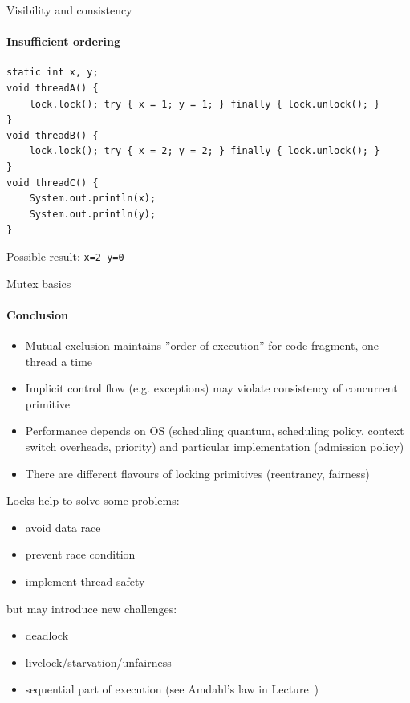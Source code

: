 

\begin{frame}[fragile]{Visibility and consistency}
\framesubtitle{Insufficient ordering}

\begin{verbatim}
static int x, y;
void threadA() {
    lock.lock(); try { x = 1; y = 1; } finally { lock.unlock(); }
}
void threadB() {
    lock.lock(); try { x = 2; y = 2; } finally { lock.unlock(); }
}
void threadC() {
    System.out.println(x);
    System.out.println(y);
}
\end{verbatim}

\pause

Possible result: \texttt{x=2 y=0}

\end{frame}


\begin{frame}{Mutex basics}
\framesubtitle{Conclusion}

\begin{itemize}
    \item Mutual exclusion maintains ''order of execution'' for code fragment, one thread a time
    \item Implicit control flow (e.g. exceptions) may violate consistency of concurrent primitive
    \item Performance depends on OS (scheduling quantum, scheduling policy, context switch overheads, priority) and particular implementation (admission policy)
    \item There are different flavours of locking primitives (reentrancy, fairness)
\end{itemize}

Locks help to solve some problems:
\begin{itemize}
    \item avoid data race
    \item prevent race condition
    \item implement thread-safety
\end{itemize}
but may introduce new challenges:
\begin{itemize}
    \item deadlock
    \item livelock/starvation/unfairness
    \item sequential part of execution (see Amdahl's law in Lecture~\introNum)
\end{itemize}

\end{frame}

